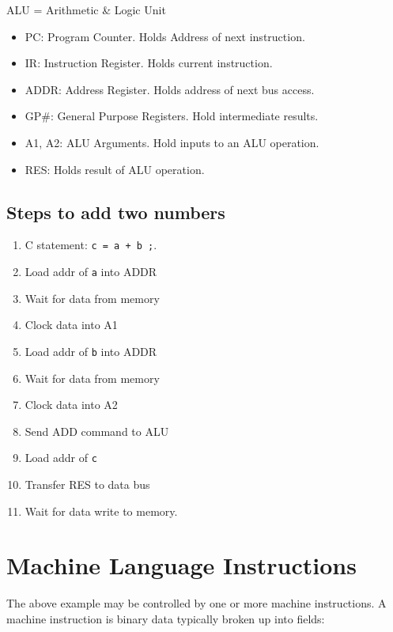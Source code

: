 \documentclass{article}	%
\begin{document}
 ALU = Arithmetic \& Logic Unit

\begin{itemize}

\item PC:  Program Counter. Holds Address of next instruction.
\item IR:  Instruction Register. Holds current instruction.
\item ADDR: Address Register. Holds address of next bus access.
\item GP\#: General Purpose Registers.  Hold intermediate results.
\item A1, A2: ALU Arguments. Hold inputs to an ALU operation.
\item RES:  Holds result of ALU operation.

\end{itemize}

\subsection{Steps to add two numbers}

\begin{enumerate}

\item C statement: {\tt c = a + b ;}.
\item  Load addr of {\tt a} into ADDR
\item  Wait for data from memory
\item  Clock data into A1
\item  Load addr of {\tt b} into ADDR
\item  Wait for data from memory
\item  Clock data into A2
\item  Send ADD command to ALU
\item  Load addr of {\tt c}
\item  Transfer RES to data bus
\item  Wait for data write to memory.

\end{enumerate}

\section{Machine Language Instructions}

The above example may be controlled by one or more machine instructions.
A machine instruction is binary data typically broken up into fields:
\end{document}

